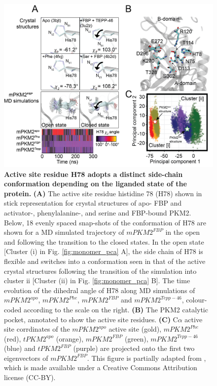 %
%
%
%
%
\begin{figure}[!ht]
\includegraphics[scale=0.76]{ch6_fig4_h78_chi2.png}
\caption[Active site residue H78 adopts a distinct side-chain conformation depending on the liganded state of the protein.] {\textbf{Active site residue H78 adopts a distinct side-chain conformation depending on the liganded state of the protein.} \textbf{(A)} The active site residue histidine 78 (H78) shown in stick representation for crystal structures of apo- FBP and activator-, phenylalanine-, and serine and FBP-bound PKM2. Below, 18 evenly spaced snap-shots of the conformation of H78 are shown for a MD simulated trajectory of $mPKM2^{FBP}$ in the open and following the transition to the closed states. In the open state [Cluster (i) in Fig. \ref{fig:monomer_pca} A], the side chain of H78 is flexible and switches into a conformation seen in that of the active crystal structures following the transition of the simulation into cluster ii [Cluster (ii) in Fig. \ref{fig:monomer_pca} B]. The time evolution of the dihedral angle of H78 along MD simulations of $mPKM2^{apo}$, $mPKM2^{Phe}$, $mPKM2^{FBP}$ and $mPKM2^{Tepp-46}$, colour-coded according to the scale on the right. \textbf{(B)} The PKM2 catalytic pocket, annotated to show the active site residues. \textbf{(C)} C$\alpha$ active site corrdinates of the $mPKM2^{apo}$ active site (gold), $mPKM2^{Phe}$ (red), $tPKM2^{apo}$ (orange), $mPKM2^{FBP}$ (green), $mPKM2^{Tepp-46}$ (blue) and $tPKM2^{FBP}$ (purple) are projected onto the first two eigenvectors of $mPKM2^{FBP}$. This figure is partially adapted from \cite{Gehrig:2017aa}, which is made available under a Creative Commons Attribution license (CC-BY).}
\label{fig:monomer_h78_chi2}
\end{figure}
